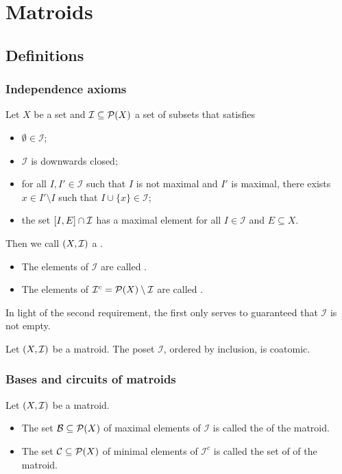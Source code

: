 \chapter{Matroids}
\section{Definitions}
\subsection{Independence axioms}
\begin{definition}
Let $X$ be a set and $\mathcal{I} \subseteq \operatorname{\mathcal{P}}(X)$ a set of subsets that satisfies
\begin{itemize}
\item $\emptyset\in \mathcal{I}$;
\item $\mathcal{I}$ is downwards closed;
\item for all $I, I'\in \mathcal{I}$ such that $I$ is not maximal and $I'$ is maximal, there exists $x\in I'\setminus I$ such that $I\cup \{x\}\in \mathcal{I}$;
\item the set $\interval{I, E}\cap \mathcal{I}$ has a maximal element for all $I\in \mathcal{I}$ and $E\subseteq X$. 
\end{itemize}
Then we call $\left( X, \mathcal{I} \right)$ a .
\begin{itemize}
\item The elements of $\mathcal{I}$ are called .
\item The elements of $\mathcal{I}^c = \operatorname{\mathcal{P}}(X)\setminus \mathcal{I}$ are called .
\end{itemize}
\end{definition}
In light of the second requirement, the first only serves to guaranteed that $\mathcal{I}$ is not empty.

\begin{lemma}
Let $\left( X, \mathcal{I} \right)$ be a matroid. The poset $\mathcal{I}$, ordered by inclusion, is coatomic.
\end{lemma}

\subsection{Bases and circuits of matroids}
\begin{definition}
Let $\left( X,\mathcal{I} \right)$ be a matroid.
\begin{itemize}
\item The set $\mathcal{B} \subseteq \operatorname{\mathcal{P}}(X)$ of maximal elements of $\mathcal{I}$ is called the  of the matroid.
\item The set $\mathcal{C}\subseteq \operatorname{\mathcal{P}}(X)$ of minimal elements of $\mathcal{I}^c$ is called the set of  of the matroid.
\end{itemize}
\end{definition}

